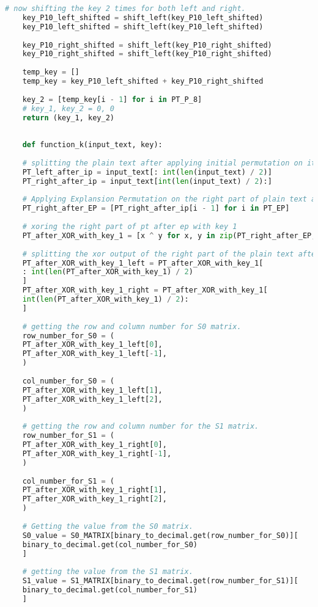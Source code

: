 \documentclass{article}
\begin{document}
\begin{lstlisting}[language=python, caption={Input Code}]
	# now shifting the key 2 times for both left and right.
	key_P10_left_shifted = shift_left(key_P10_left_shifted)
	key_P10_left_shifted = shift_left(key_P10_left_shifted)
	
	key_P10_right_shifted = shift_left(key_P10_right_shifted)
	key_P10_right_shifted = shift_left(key_P10_right_shifted)
	
	temp_key = []
	temp_key = key_P10_left_shifted + key_P10_right_shifted
	
	key_2 = [temp_key[i - 1] for i in PT_P_8]
	# key_1, key_2 = 0, 0
	return (key_1, key_2)
	
	
	def function_k(input_text, key):
	
	# splitting the plain text after applying initial permutation on it.
	PT_left_after_ip = input_text[: int(len(input_text) / 2)]
	PT_right_after_ip = input_text[int(len(input_text) / 2):]
	
	# Applying Explansion Permutation on the right part of plain text after ip
	PT_right_after_EP = [PT_right_after_ip[i - 1] for i in PT_EP]
	
	# xoring the right part of pt after ep with key 1
	PT_after_XOR_with_key_1 = [x ^ y for x, y in zip(PT_right_after_EP, key)]
	
	# splitting the xor output of the right part of the plain text after ep.
	PT_after_XOR_with_key_1_left = PT_after_XOR_with_key_1[
	: int(len(PT_after_XOR_with_key_1) / 2)
	]
	PT_after_XOR_with_key_1_right = PT_after_XOR_with_key_1[
	int(len(PT_after_XOR_with_key_1) / 2):
	]
	
	# getting the row and column number for S0 matrix.
	row_number_for_S0 = (
	PT_after_XOR_with_key_1_left[0],
	PT_after_XOR_with_key_1_left[-1],
	)
	
	col_number_for_S0 = (
	PT_after_XOR_with_key_1_left[1],
	PT_after_XOR_with_key_1_left[2],
	)
	
	# getting the row and column number for the S1 matrix.
	row_number_for_S1 = (
	PT_after_XOR_with_key_1_right[0],
	PT_after_XOR_with_key_1_right[-1],
	)
	
	col_number_for_S1 = (
	PT_after_XOR_with_key_1_right[1],
	PT_after_XOR_with_key_1_right[2],
	)
	
	# Getting the value from the S0 matrix.
	S0_value = S0_MATRIX[binary_to_decimal.get(row_number_for_S0)][
	binary_to_decimal.get(col_number_for_S0)
	]
	
	# getting the value from the S1 matrix.
	S1_value = S1_MATRIX[binary_to_decimal.get(row_number_for_S1)][
	binary_to_decimal.get(col_number_for_S1)
	]
	

\end{lstlisting}
\end{document}

